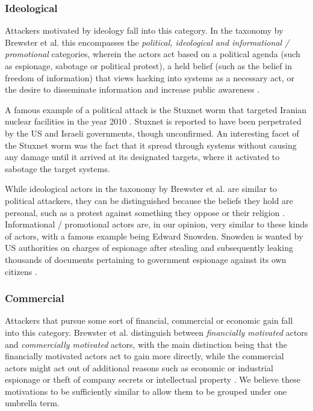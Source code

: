 \subsubsection{Ideological}
Attackers motivated by ideology fall into this category. In the taxonomy by Brewster et al. this encompasses the
\emph{political, ideological and informational / promotional} categories, wherein the actors act based on a political
agenda (such as espionage, sabotage or political protest), a held belief (such as the belief in freedom of information)
that views hacking into systems as a necessary act, or the desire to disseminate information and increase public
awareness \cite{brewster-malware-motivation}.

A famous example of a political attack is the Stuxnet worm that targeted Iranian nuclear facilities in the year
2010 \cite{brewster-malware-motivation}. Stuxnet is reported to have been perpetrated by the US and Israeli governments,
though unconfirmed. %
An interesting facet of the Stuxnet worm was the fact that it spread through systems without causing any damage until it
arrived at its designated targets, where it activated to sabotage the target systems. %

While ideological actors in the taxonomy by Brewster et al. are similar to political attackers, they can be
distinguished because the beliefs they hold are personal, such as a protest against something they oppose or their 
religion \cite{brewster-malware-motivation}. Informational / promotional actors are, in our opinion, very similar to
these kinds of actors, with a famous example being Edward Snowden. Snowden is wanted by US authorities on charges of
espionage after stealing and subsequently leaking thousands of documents pertaining to government espionage against its
own citizens \cite{snowden}.

\subsubsection{Commercial}
Attackers that pursue some sort of financial, commercial or economic gain fall into this category. Brewster et al.
distinguish between \emph{financially motivated} actors and \emph{commercially motivated} actors, with the main
distinction being that the financially motivated actors act to gain more directly, while the commercial actors might
act out of additional reasons such as economic or industrial espionage or theft of company secrets or intellectual
property \cite{brewster-malware-motivation}.
We believe these motivations to be sufficiently similar to allow them to be grouped under one umbrella term.

